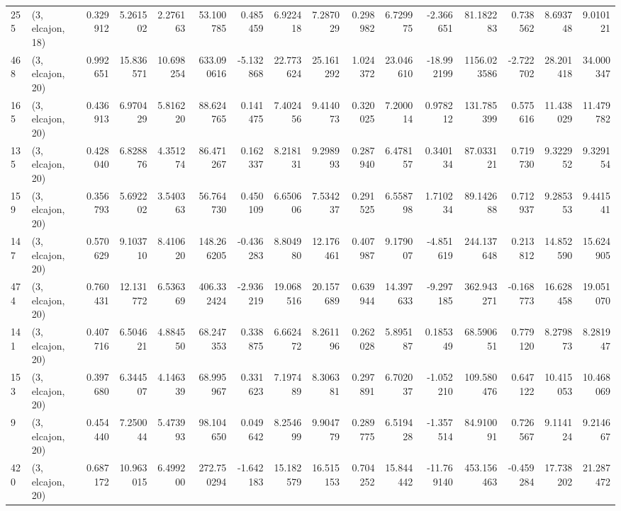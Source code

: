\begin{tabular}{llrrrrrrrrrrrrrr}
255 &  (3, elcajon, 18) &   0.329912 &   5.261502 &   2.276163 &    53.100785 &   0.485459 &   6.922418 &   7.287029 &  0.298982 &   6.729975 &  -2.366651 &     81.182283 &    0.738562 &    8.693748 &    9.010121 \\
468 &  (3, elcajon, 20) &   0.992651 &  15.836571 &  10.698254 &   633.090616 &  -5.132868 &  22.773624 &  25.161292 &  1.024372 &  23.046610 & -18.992199 &   1156.023586 &   -2.722702 &   28.201418 &   34.000347 \\
165 &  (3, elcajon, 20) &   0.436913 &   6.970429 &   5.816220 &    88.624765 &   0.141475 &   7.402456 &   9.414073 &  0.320025 &   7.200014 &   0.978212 &    131.785399 &    0.575616 &   11.438029 &   11.479782 \\
135 &  (3, elcajon, 20) &   0.428040 &   6.828876 &   4.351274 &    86.471267 &   0.162337 &   8.218131 &   9.298993 &  0.287940 &   6.478157 &   0.340134 &     87.033121 &    0.719730 &    9.322952 &    9.329154 \\
159 &  (3, elcajon, 20) &   0.356793 &   5.692202 &   3.540363 &    56.764730 &   0.450109 &   6.650606 &   7.534237 &  0.291525 &   6.558798 &   1.710234 &     89.142688 &    0.712937 &    9.285353 &    9.441541 \\
147 &  (3, elcajon, 20) &   0.570629 &   9.103710 &   8.410620 &   148.266205 &  -0.436283 &   8.804980 &  12.176461 &  0.407987 &   9.179007 &  -4.851619 &    244.137648 &    0.213812 &   14.852590 &   15.624905 \\
474 &  (3, elcajon, 20) &   0.760431 &  12.131772 &   6.536369 &   406.332424 &  -2.936219 &  19.068516 &  20.157689 &  0.639944 &  14.397633 &  -9.297185 &    362.943271 &   -0.168773 &   16.628458 &   19.051070 \\
141 &  (3, elcajon, 20) &   0.407716 &   6.504621 &   4.884550 &    68.247353 &   0.338875 &   6.662472 &   8.261196 &  0.262028 &   5.895187 &   0.185349 &     68.590651 &    0.779120 &    8.279873 &    8.281947 \\
153 &  (3, elcajon, 20) &   0.397680 &   6.344507 &   4.146339 &    68.995967 &   0.331623 &   7.197489 &   8.306381 &  0.297891 &   6.702037 &  -1.052210 &    109.580476 &    0.647122 &   10.415053 &   10.468069 \\
9   &  (3, elcajon, 20) &   0.454440 &   7.250044 &   5.473993 &    98.104650 &   0.049642 &   8.254699 &   9.904779 &  0.289775 &   6.519428 &  -1.357514 &     84.910091 &    0.726567 &    9.114124 &    9.214667 \\
420 &  (3, elcajon, 20) &   0.687172 &  10.963015 &   6.499200 &   272.750294 &  -1.642183 &  15.182579 &  16.515153 &  0.704252 &  15.844442 & -11.769140 &    453.156463 &   -0.459284 &   17.738202 &   21.287472 \\

\end{tabular}
